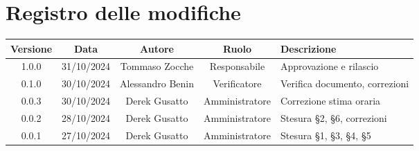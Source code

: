 
\section*{Registro delle modifiche}
\begin{table}[H]
    \begin{tabular}{|c|c|c|c|p{4cm}|}
        \hline
         \textbf{Versione} &  \textbf{Data} &  \textbf{Autore} &  \textbf{Ruolo} & \textbf{Descrizione} \\
          \hline
          1.0.0& 31/10/2024 & Tommaso Zocche & Responsabile & Approvazione e rilascio\\
          \hline
          0.1.0&  30/10/2024& Alessandro Benin & Verificatore & Verifica documento, correzioni \\
          \hline
          0.0.3&  30/10/2024&Derek Gusatto  & Amministratore &  Correzione stima oraria\\
          \hline
          0.0.2&  28/10/2024&Derek Gusatto  & Amministratore &  Stesura §2, §6, correzioni\\
          \hline
          0.0.1&  27/10/2024&Derek Gusatto  & Amministratore &  Stesura §1, §3, §4,  §5\\
          \hline
    \end{tabular}
\end{table}